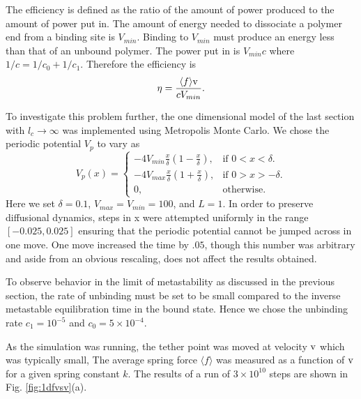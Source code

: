 \documentclass[11pt]{ucthesis}
\begin{document}
The efficiency is defined as the ratio of the amount of power produced to the
amount of power put in. The amount of energy needed to dissociate a polymer end
from a binding site is $V_{min}$. Binding to $V_{min}$ must produce an energy less
than that of an unbound polymer. The power put in is $V_{min} c$ where $1/c =
1/c_0 + 1/c_1$. Therefore the efficiency is
\begin{equation}
\label{eq:efficiency}
\eta = \frac{\langle f\rangle {\rm v}}{c V_{min}} .
\end{equation}

To investigate this problem further, the one dimensional model of the last
section with $l_c\rightarrow \infty$ was implemented using Metropolis Monte Carlo.
We chose the periodic potential $V_p$ to vary as
\begin{equation}
\label{eq:Vp1dsim}
V_p(x)  =\begin{cases}
-4 V_{min} \frac{x}{\delta}(1-\frac{x}{\delta}),  & \text{if $0 < x< \delta$}.\\
-4 V_{max} \frac{x}{\delta}(1+\frac{x}{\delta}),  & \text{if $0 > x> -\delta$}.\\
0, & \text{otherwise}.
\end{cases}
\end{equation}
Here we set $\delta = 0.1$, $V_{max} = V_{min} = 100$, and $L=1$. 
In order to preserve diffusional dynamics, steps in x were attempted uniformly 
in the range $[-0.025,0.025]$ ensuring that the periodic potential cannot
be jumped across in one move. One move increased the time by $.05$, though this
number was arbitrary and aside from an obvious rescaling, does not affect the results obtained.

To observe behavior in the limit of metastability as discussed in the previous
section, the rate of unbinding must be set to be small compared to the inverse
metastable equilibration time in the bound state. Hence we chose the unbinding
rate $c_1 = 10^{-5}$ and $c_0 = 5\times 10^{-4}$. 

As the simulation was running, the tether point was moved at velocity $\rm v$
which was typically small, 
The average spring force $\langle f\rangle$ was measured as a function of $\rm v$
for a given spring constant $k$. The results of a run of $3\times 10^{10}$ steps
are shown in Fig. \ref{fig:1dfvsv}(a).
\end{document}
